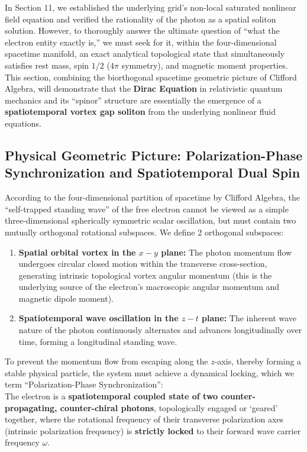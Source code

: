 \documentclass[12pt, a4paper]{article}
\begin{document}
In Section 11, we established the underlying grid's non-local saturated nonlinear field equation and verified the rationality of the photon as a spatial soliton solution. However, to thoroughly answer the ultimate question of ``what the electron entity exactly is,'' we must seek for it, within the four-dimensional spacetime manifold, an exact analytical topological state that simultaneously satisfies rest mass, spin $1/2$ ($4\pi$ symmetry), and magnetic moment properties. This section, combining the biorthogonal spacetime geometric picture of Clifford Algebra, will demonstrate that the \textbf{Dirac Equation} in relativistic quantum mechanics and its ``spinor'' structure are essentially the emergence of a \textbf{spatiotemporal vortex gap soliton} from the underlying nonlinear fluid equations.

\subsection{Physical Geometric Picture: Polarization-Phase Synchronization and Spatiotemporal Dual Spin}

According to the four-dimensional partition of spacetime by Clifford Algebra, the ``self-trapped standing wave'' of the free electron cannot be viewed as a simple three-dimensional spherically symmetric scalar oscillation, but must contain two mutually orthogonal rotational subspaces. We define 2 orthogonal subspaces:

\begin{enumerate}
    \item \textbf{Spatial orbital vortex in the $x-y$ plane:} The photon momentum flow undergoes circular closed motion within the transverse cross-section, generating intrinsic topological vortex angular momentum (this is the underlying source of the electron's macroscopic angular momentum and magnetic dipole moment).
    \item \textbf{Spatiotemporal wave oscillation in the $z-t$ plane:} The inherent wave nature of the photon continuously alternates and advances longitudinally over time, forming a longitudinal standing wave.
\end{enumerate}

To prevent the momentum flow from escaping along the $z$-axis, thereby forming a stable physical particle, the system must achieve a dynamical locking, which we term ``Polarization-Phase Synchronization'':\\
The electron is a \textbf{spatiotemporal coupled state of two counter-propagating, counter-chiral photons}, topologically engaged or `geared' together, where the rotational frequency of their transverse polarization axes (intrinsic polarization frequency) is \textbf{strictly locked} to their forward wave carrier frequency $\omega$.
\end{document}

